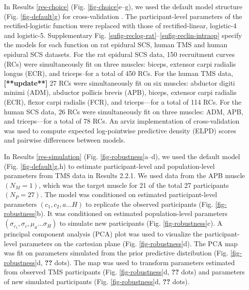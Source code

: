 \documentclass[sn-mathphys-ay]{sn-jnl}%
\theoremstyle{thmstyleone}%
\theoremstyle{thmstyletwo}%
\theoremstyle{thmstylethree}%
\begin{document}
\bigskip\noindent In Results \ref{res-choice} (Fig. \ref{fig-choice}e--g), we used the default model structure (Fig. \ref{fig-default}g) for cross-validation \cite{vehtari_practical_2017}. The participant-level parameters of the rectified-logistic function were replaced with those of rectified-linear, logistic-4 and logistic-5. Supplementary Fig. \ref{sufig-reclog-rat}--\ref{sufig-reclin-intraop} specify the models for each function on rat epidural SCS, human TMS and human epidural SCS datasets. For the rat epidural SCS data, 150 recruitment curves (RCs) were simultaneously fit on three muscles: biceps, extensor carpi radialis longus (ECR), and triceps--for a total of 450 RCs. For the human TMS data, \textbf{[**update**]} 27 RCs  were simultaneously fit on six muscles: abductor digiti minimi (ADM), abductor pollicis brevis (APB), biceps, extensor carpi radialis (ECR), flexor carpi radialis (FCR), and triceps—for a total of 114 RCs. For the human SCS data, 26 RCs were simultaneously fit on three muscles: ADM, APB, and triceps—for a total of 78 RCs. An arviz \cite{kumar_arviz_2019} implementation of cross-validation \cite{vehtari_practical_2017} was used to compute expected log-pointwise predictive density (ELPD) scores and pairwise differences between models.

\bigskip\noindent In Results \ref{res-simulation} (Fig. \ref{fig-robustness}a--d), we used the default model (Fig. \ref{fig-default}g,h) to estimate participant-level and population-level parameters from TMS data in Results 2.2.1. We used data from the APB muscle $\left(N_M = 1\right)$, which was the target muscle for 21 of the total 27 participants $\left(N_P = 27\right)$. The model was conditioned on estimated participant-level parameters $\left(c_1, c_2, a \ldots H\right)$ to replicate the observed participants (Fig. \ref{fig-robustness}b). It was conditioned on estimated population-level parameters $\left(\sigma_{c_1}, \sigma_{c}, \mu_a \ldots \sigma_H\right)$ to simulate new participants (Fig. \ref{fig-robustness}c). A principal component analysis (PCA) plot was used to visualize the participant-level parameters on the cartesian plane (Fig. \ref{fig-robustness}d). The PCA map was fit on parameters simulated from the prior predictive distribution (Fig. \ref{fig-robustness}d, \textbf{??} dots). The map was used to transform parameters estimated from observed TMS participants (Fig. \ref{fig-robustness}d, \textbf{??} dots) and parameters of new simulated participants (Fig. \ref{fig-robustness}d, \textbf{??} dots).
\end{document}
